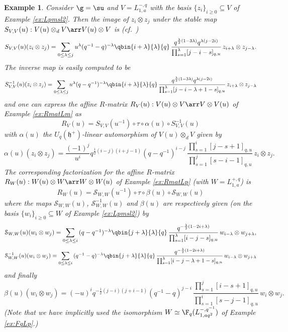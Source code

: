 \documentclass[11pt]{amsart}
\newtheorem{example}[theorem]{Example}
\theoremstyle{definition}
\theoremstyle{remark}
\numberwithin{equation}{section}
\begin{document}
\begin{example} Consider $\g = \su$ and $V = L_{1,a}^{-,q}$ with the basis $\{z_i\}_{i\geq 0}\subseteq V$ of Example \ref{ex:Lpmsl2}. Then the image of $z_i\otimes z_j$ under the stable map $S_{V,V}(u):V(u)\otimes_d V\arr V(u)\otimes V$ is (cf.~\cite{her})
$$ S_{V,V}(u)(z_i\otimes z_j) = \sum_{0\leq \lambda \leq j} {\textstyle u^{\lambda}(q^{-1}-q)^{-\lambda} \qbin{i+\lambda}{\lambda}{q}}\,\frac{q^{\frac{\lambda}{2}(1-3\lambda)}q^{\lambda(j-2i)}}{\prod_{s=1}^{\lambda}[j-i-s]_{q,u}}\,z_{i+\lambda}\otimes z_{j-\lambda}.$$
The inverse map is easily computed to be
$$ S_{V,V}^{-1}(u)(z_i\otimes z_j) = \sum_{0\leq \lambda \leq j} {\textstyle u^{\lambda}(q-q^{-1})^{-\lambda} \qbin{i+\lambda}{\lambda}{q}}\,\frac{q^{\frac{\lambda}{2}(1-3\lambda)}q^{\lambda(j-2i)}}{\prod_{s=1}^{\lambda}[j-i-\lambda+1-s]_{q,u}}\,z_{i+\lambda}\otimes z_{j-\lambda} $$
and one can express the affine $R$-matrix $R_{V}(u):V(u)\otimes V\arr V\otimes V(u)$ of Example \ref{ex:RmatLm} as $$R_{V}(u) = S_{V,V}(u^{-1})\circ\tau\circ \alpha(u)\circ S_{V,V}^{-1}(u)$$ with $\alpha(u)$ the $U_q(\mathfrak{h}^+)$-linear automorphism of $V(u)\otimes_d V$ given by
$$ \alpha(u)(z_i\otimes z_j) = \frac{(-1)^j}{u^{i}} q^{\frac{1}{2}(i-j)(i+j-1)}(q - q^{-1})^{i - j}\,\frac{\prod_{s=1}^i[j-s+1]_{q,u}}{\prod_{s=1}^j [s-i-1]_{q,u}}\,z_i\otimes z_j.$$
The corresponding factorization for the affine $R$-matrix $R_{W}(u):W(u)\otimes W\arr W\otimes W(u)$ of Example \ref{ex:RmatLp} (with $W = L_{1,a}^{+,q}$) is 
$$ R_W(u) = \mathcal{S}_{W,W}(u^{-1})\circ \tau\circ \beta(u)\circ \mathcal{S}_{W,W}(u) $$
where the maps $\mathcal{S}_{W,W}(u)$, $\mathcal{S}_{W,W}^{-1}(u)$ and $\beta(u)$ are respectively given (on the basis $\{w_i\}_{i\geq 0}\subseteq W$ of Example \ref{ex:Lpmsl2}) by 
$$ \mathcal{S}_{W,W}(u)(w_i\otimes w_j) = \sum_{0\leq \lambda \leq i} {\textstyle (q-q^{-1})^{-\lambda} \qbin{j+\lambda}{\lambda}{q}}\,\frac{q^{-\frac{\lambda}{2}(1-2i+\lambda)}}{\prod_{s=1}^{\lambda}[i-j-s]_{q,u}}\,w_{i-\lambda}\otimes w_{j+\lambda},$$ 
$$ \mathcal{S}_{W,W}^{-1}(u)(w_i\otimes w_j) = \sum_{0\leq \lambda \leq i} {\textstyle (q^{-1}-q)^{-\lambda} \qbin{j+\lambda}{\lambda}{q}}\,\frac{q^{-\frac{\lambda}{2}(1-2i+\lambda)}}{\prod_{s=1}^{\lambda}[i-j-\lambda+1-s]_{q,u}}\,w_{i-\lambda}\otimes w_{j+\lambda}$$
and finally
$$ \beta(u)(w_i\otimes w_j)=(-u)^i q^{-\frac{1}{2}(j-i)(j+i-1)}(q^{-1} - q)^{j - i}\,\frac{\prod_{s=1}^j [i-s+1]_{q,u}}{\prod_{s=1}^i [s-j-1]_{q,u}}\,w_i\otimes w_j.$$
(Note that we have implicitly used the isomorphism $W \simeq \F_q(L_{1,a q^{2}}^{-,q^{-1}})$ of Example \ref{ex:FqLp}.)
\end{example}
\end{document}
